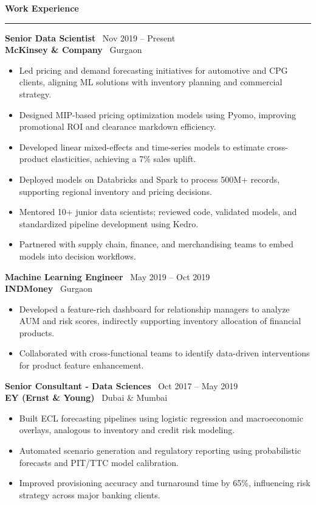 \documentclass[a4paper,10pt]{article}
\begin{document}
\vspace{1mm}
\textbf{\large Work Experience} \\
\rule{\textwidth}{0.8pt}

\noindent
\textbf{Senior Data Scientist} \hfill \faCalendar \, Nov 2019 -- Present \\
\textbf{McKinsey \& Company} \hfill \faMapMarker \, Gurgaon
\begin{itemize}[itemsep=1pt, topsep=0pt]
    \item Led pricing and demand forecasting initiatives for automotive and CPG clients, aligning ML solutions with inventory planning and commercial strategy.
    \item Designed MIP-based pricing optimization models using Pyomo, improving promotional ROI and clearance markdown efficiency.
    \item Developed linear mixed-effects and time-series models to estimate cross-product elasticities, achieving a 7\% sales uplift.
    \item Deployed models on Databricks and Spark to process 500M+ records, supporting regional inventory and pricing decisions.
    \item Mentored 10+ junior data scientists; reviewed code, validated models, and standardized pipeline development using Kedro.
    \item Partnered with supply chain, finance, and merchandising teams to embed models into decision workflows.
\end{itemize}

\noindent
\textbf{Machine Learning Engineer} \hfill \faCalendar \, May 2019 -- Oct 2019 \\
\textbf{INDMoney} \hfill \faMapMarker \, Gurgaon
\begin{itemize}[itemsep=1pt, topsep=0pt]
    \item Developed a feature-rich dashboard for relationship managers to analyze AUM and risk scores, indirectly supporting inventory allocation of financial products.
    \item Collaborated with cross-functional teams to identify data-driven interventions for product feature enhancement.
\end{itemize}

\noindent
\textbf{Senior Consultant - Data Sciences} \hfill \faCalendar \, Oct 2017 -- May 2019 \\
\textbf{EY (Ernst \& Young)} \hfill \faMapMarker \, Dubai \& Mumbai
\begin{itemize}[itemsep=1pt, topsep=0pt]
    \item Built ECL forecasting pipelines using logistic regression and macroeconomic overlays, analogous to inventory and credit risk modeling.
    \item Automated scenario generation and regulatory reporting using probabilistic forecasts and PIT/TTC model calibration.
    \item Improved provisioning accuracy and turnaround time by 65\%, influencing risk strategy across major banking clients.
\end{itemize}
\end{document}
